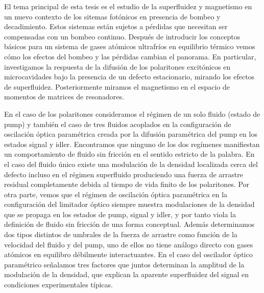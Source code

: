 El tema principal de esta tesis es el estudio de la superfluidez y
magnetismo en un nuevo contexto de los sitemas fot\'onicos en
presencia de bombeo y decadimiento. Estos sistemas est\'an sujetos a
p\'erdidas que necesitan ser compensadas con un bombeo
continuo. Despu\'es de introducir los conceptos b\'asicos para un
sistema de gases at\'omicos ultrafr\'ios en equilibrio t\'ermico vemos
c\'omo los efectos del bombeo y las p\'erdidas cambian el panorama. En
particular, investigamos la respuesta de la difusi\'on de los
polaritones excit\'onicos en microcavidades bajo la presencia de un
defecto estacionario, mirando los efectos de
superfluidez. Posteriormente miramos el magnetismo en el espacio de
momentos de matrices de resonadores.

En el caso de los polaritones consideramos el r\'egimen de un solo
fluido (estado de pump) y tambi\'en el caso de tres fluidos acoplados
en la configuraci\'on de oscilaci\'on \'optica param\'etrica creada
por la difusi\'on param\'etrica del pump en los estados signal y
idler. Encontramos que ninguno de los dos reg\'imenes manifiestan un
comportamiento de fluido sin fricci\'on en el sentido estricto de la
palabra. En el caso del fluido \'unico existe una modulaci\'on de la
densidad localizada cerca del defecto incluso en el r\'egimen
superfluido produciendo una fuerza de arrastre residual completamente
debida al tiempo de vida finito de los polaritones. Por otra parte,
vemos que el r\'egimen de oscilaci\'on \'optica param\'etrica en la
configuraci\'on del limitador \'optico siempre muestra modulaciones de
la densidad que se propaga en los estados de pump, signal y idler, y
por tanto viola la definici\'on de fluido sin fricci\'on de una forma
conceptual. Adem\'as determinamos dos tipos distintos de umbrales de
la fuerza de arrastre como funci\'on de la velocidad del fluido y del
pump, uno de ellos no tiene an\'alogo directo con gases at\'omicos en
equilibro d\'ebilmente interactuantes. En el caso del oscilador
\'optico param\'etrico se\~nalamos tres factores que juntos determinan
la amplitud de la modulaci\'on de la densidad, que explican la
aparente superfluidez del signal en condiciones experimentales
t\'ipicas.

